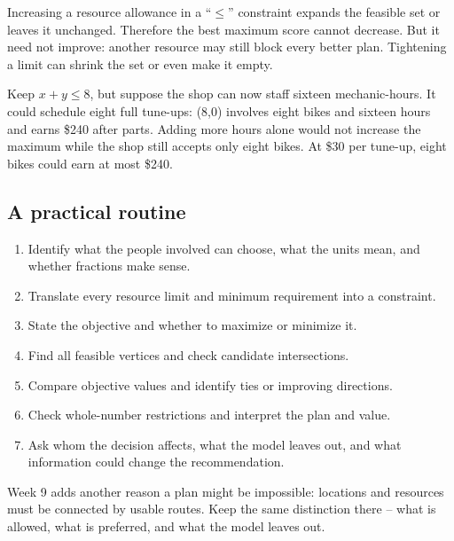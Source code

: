 \documentclass[11pt,letterpaper]{article}
\begin{document}
Increasing a resource allowance in a ``$\le$'' constraint expands the feasible set or leaves it unchanged. Therefore the best maximum score cannot decrease. But it need not improve: another resource may still block every better plan. Tightening a limit can shrink the set or even make it empty.


\begin{tcolorbox}[title={Example \textperiodcentered{} More mechanic-hours do not create more customers},breakable]

Keep \(x+y\leq8\), but suppose the shop can now staff sixteen mechanic-hours. It could schedule eight full tune-ups: (8,0) involves eight bikes and sixteen hours and earns \$240 after parts. Adding more hours alone would not increase the maximum while the shop still accepts only eight bikes. At \$30 per tune-up, eight bikes could earn at most \$240.


\end{tcolorbox}

\subsection*{A practical routine}

\begin{enumerate}
\item Identify what the people involved can choose, what the units mean, and whether fractions make sense.
\item Translate every resource limit and minimum requirement into a constraint.
\item State the objective and whether to maximize or minimize it.
\item Find all feasible vertices and check candidate intersections.
\item Compare objective values and identify ties or improving directions.
\item Check whole-number restrictions and interpret the plan and value.
\item Ask whom the decision affects, what the model leaves out, and what information could change the recommendation.

\end{enumerate}

Week 9 adds another reason a plan might be impossible: locations and resources must be connected by usable routes. Keep the same distinction there -- what is allowed, what is preferred, and what the model leaves out.
\end{document}
